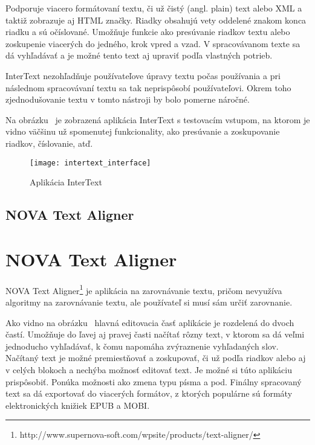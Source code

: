 Podporuje viacero formátovaní textu, či už čistý (angl. plain) text alebo XML a taktiž zobrazuje aj HTML značky. Riadky obsahujú vety oddelené znakom konca riadku a sú očíslované. Umožňuje funkcie ako presúvanie riadkov textu alebo zoskupenie viacerých do jedného, krok vpred a vzad. V spracovávanom texte sa dá vyhľadávať a je možné tento text aj upraviť podľa vlastných potrieb.

InterText nezohľadňuje používateľove úpravy textu počas používania a pri následnom spracovávaní textu sa tak neprispôsobí používateľovi. Okrem toho zjednodušovanie textu v tomto nástroji by bolo pomerne náročné.

Na obrázku~ je zobrazená aplikácia InterText s testovacím vstupom, na ktorom je vidno väčšinu už spomenutej funkcionality, ako presúvanie a zoskupovanie riadkov, číslovanie, atď.

\begin{figure}[H]
	\begin{center}\texttt{[image: intertext\_interface]}\end{center}
	\caption[Aplikácia InterText]{Aplikácia InterText}\label{fig:intertext_interface}
\end{figure}

%
%
{
	\subsection{NOVA Text Aligner}
}
{
	\section{NOVA Text Aligner}
}
NOVA Text Aligner\footnote{http://www.supernova-soft.com/wpsite/products/text-aligner/} je aplikácia na zarovnávanie textu, pričom nevyužíva algoritmy na zarovnávanie textu, ale používateľ si musí sám určiť zarovnanie.

Ako vidno na obrázku~ hlavná editovacia časť aplikácie je rozdelená do dvoch častí. Umožňuje do ľavej aj pravej časti načítať rôzny text, v ktorom sa dá veľmi jednoducho vyhľadávať, k čomu napomáha zvýraznenie vyhľadaných slov. Načítaný text je možné premiestňovať a zoskupovať, či už podľa riadkov alebo aj v celých blokoch a nechýba možnosť editovať text. Je možné si túto aplikáciu prispôsobiť. Ponúka možnosti ako zmena typu písma a pod. Finálny spracovaný text sa dá exportovať do viacerých formátov, z ktorých populárne sú formáty elektronických knižiek EPUB a MOBI.

